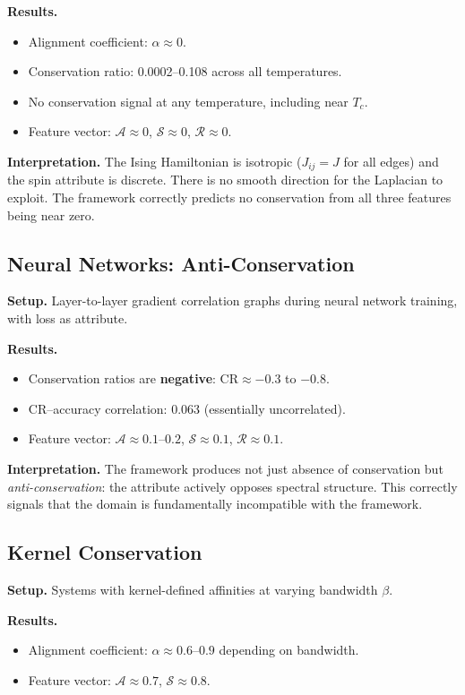 \documentclass[12pt,letterpaper]{article}
\newcommand{\CR}{\mathrm{CR}}
\newcommand{\cA}{\mathcal{A}}
\newcommand{\cS}{\mathcal{S}}
\newcommand{\cR}{\mathcal{R}}
\begin{document}
\textbf{Results.}
\begin{itemize}
  \item Alignment coefficient: $\alpha \approx 0$.
  \item Conservation ratio: 0.0002--0.108 across all temperatures.
  \item No conservation signal at any temperature, including near $T_c$.
  \item Feature vector: $\cA \approx 0$, $\cS \approx 0$, $\cR \approx 0$.
\end{itemize}

\textbf{Interpretation.} The Ising Hamiltonian is isotropic ($J_{ij} = J$ for all edges) and the spin attribute is discrete. There is no smooth direction for the Laplacian to exploit. The framework correctly predicts no conservation from all three features being near zero.

\subsection{Neural Networks: Anti-Conservation}

\textbf{Setup.} Layer-to-layer gradient correlation graphs during neural network training, with loss as attribute.

\textbf{Results.}
\begin{itemize}
  \item Conservation ratios are \textbf{negative}: $\CR \approx -0.3$ to $-0.8$.
  \item CR--accuracy correlation: 0.063 (essentially uncorrelated).
  \item Feature vector: $\cA \approx 0.1$--$0.2$, $\cS \approx 0.1$, $\cR \approx 0.1$.
\end{itemize}

\textbf{Interpretation.} The framework produces not just absence of conservation but \emph{anti-conservation}: the attribute actively opposes spectral structure. This correctly signals that the domain is fundamentally incompatible with the framework.

\subsection{Kernel Conservation}

\textbf{Setup.} Systems with kernel-defined affinities at varying bandwidth $\beta$.

\textbf{Results.}
\begin{itemize}
  \item Alignment coefficient: $\alpha \approx 0.6$--$0.9$ depending on bandwidth.
  \item Feature vector: $\cA \approx 0.7$, $\cS \approx 0.8$.
\end{itemize}
\end{document}
